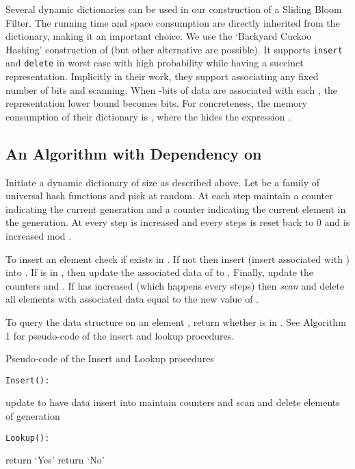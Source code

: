 \documentclass[11pt]{article}
\begin{document}
Several dynamic dictionaries can be used in our construction of a Sliding Bloom Filter. The running time and space consumption are directly inherited from the dictionary, making it an important choice. We use the `Backyard Cuckoo Hashing' construction of \cite{ArbitmanNS10} (but other alternative are possible). It supports \texttt{insert} and \texttt{delete} in  worst case with high probability while having a succinct representation. Implicitly in their work, they support associating any fixed number of bits and scanning. When -bits of data are associated with each , the representation lower bound becomes  bits. For concreteness, the memory consumption of their dictionary is , where the  hides the expression .

\subsection{An Algorithm with Dependency on }\label{Algorithm1}
Initiate a dynamic dictionary  of size  as described above. Let  be a family of universal hash functions and pick  at random. At each step maintain a counter  indicating the current generation and a counter  indicating the current element in the generation. At every step  is increased and every  steps  is reset back to 0 and  is increased mod .

To insert an element  check if  exists in . If not then insert  (insert  associated with ) into . If  is in , then update the associated data of  to . Finally, update the counters  and . If  has increased (which happens every  steps) then \emph{scan}  and delete all elements with associated data equal to the new value of .

To query the data structure on an element , return whether  is in . See Algorithm 1 for pseudo-code of the insert and lookup procedures.

\begin{algorithm}
\caption {Pseudo-code of the Insert and Lookup procedures}
\texttt{Insert():}
\begin{algorithmic}[1]

	\State update  to have data 
\Else
	\State insert  into 
\EndIf
\State maintain counters  and 
	\State scan  and delete elements of generation 
\EndIf
\newline
\end{algorithmic}

\texttt{Lookup():}
\begin{algorithmic}[1]
	\State return `Yes'
\Else
	\State return `No'
\EndIf
\EndProcedure
\end{algorithmic}
\end{algorithm}
\end{document}
